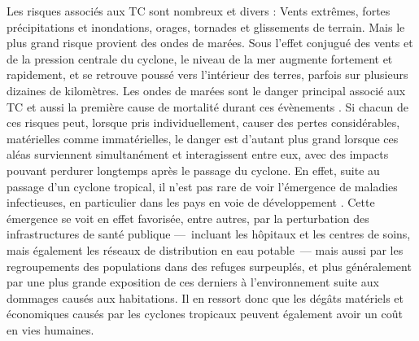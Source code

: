\documentclass[../main.tex]{subfiles}
\begin{document}
Les risques associés aux TC sont nombreux et divers : Vents extrêmes, fortes précipitations et inondations, orages, tornades et glissements de terrain. Mais le plus grand risque provient des ondes de marées. Sous l'effet conjugué des vents et de la pression centrale du cyclone, le niveau de la mer augmente fortement et rapidement, et se retrouve poussé vers l'intérieur des terres, parfois sur
plusieurs dizaines de kilomètres. Les ondes de marées
sont le danger principal associé aux TC et aussi la première cause de mortalité durant ces évènements \parencite{needham_review_2015}. Si chacun de ces risques peut, lorsque pris individuellement, causer des pertes considérables, matérielles comme immatérielles, le danger est d'autant plus grand lorsque ces aléas surviennent simultanément et interagissent entre eux, avec des impacts pouvant perdurer longtemps après le passage du cyclone. En effet, suite au passage d'un cyclone tropical, il n'est pas rare de voir l'émergence de maladies infectieuses, en
particulier dans les pays en voie de développement \parencite{shultz_epidemiology_2005}. Cette émergence se voit en effet favorisée, entre autres, par la perturbation des infrastructures de santé publique ---~incluant les hôpitaux et les centres de soins, mais également les réseaux de distribution en eau potable~--- mais aussi par les regroupements des populations dans des refuges surpeuplés, et plus généralement par une plus grande exposition de ces derniers à l'environnement suite aux dommages causés aux
habitations. Il en ressort donc que les dégâts matériels et économiques causés par les cyclones tropicaux peuvent également avoir un coût en vies humaines.
\end{document}
